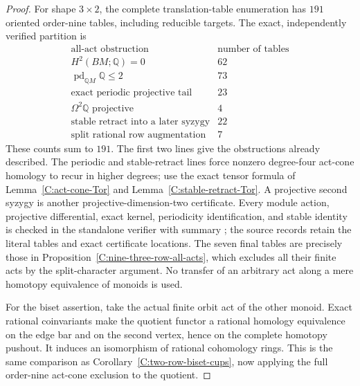\begin{proof}
For shape $3\times2$, the complete translation-table enumeration
has $191$ oriented order-nine tables, including reducible targets.
The exact, independently verified partition is
\[
\begin{array}{l|r}
 \text{all-act obstruction}&\text{number of tables}\\\hline
 H^2(BM;\mathbb Q)=0&62\\
 \operatorname{pd}_{\mathbb QM}\mathbb Q\leq2&73\\
 \text{exact periodic projective tail}&23\\
 \Omega^2\mathbb Q\text{ projective}&4\\
 \text{stable retract into a later syzygy}&22\\
 \text{split rational row augmentation}&7
\end{array}
\]
These counts sum to $191$.  The first two lines give the obstructions
already described.  The periodic and stable-retract lines force
nonzero degree-four act-cone homology to recur in higher degrees;
use the exact tensor formula of Lemma~\ref{C:act-cone-Tor} and
Lemma~\ref{C:stable-retract-Tor}.  A projective second syzygy is
another projective-dimension-two certificate.  Every module action,
projective differential, exact kernel, periodicity identification,
and stable identity is checked in the standalone verifier with
summary ; the
source records retain the literal tables and exact certificate
locations.  The seven final tables are precisely those in
Proposition~\ref{C:nine-three-row-all-acts}, which excludes all their
finite acts by the split-character argument.  No transfer of an
arbitrary act along a mere homotopy equivalence of monoids is used.

For the biset assertion, take the actual finite orbit act of the
other monoid.  Exact rational coinvariants make the quotient functor
a rational homology equivalence on the edge bar and on the second
vertex, hence on the complete homotopy pushout.  It induces an
isomorphism of rational cohomology rings.  This is the same
comparison as Corollary~\ref{C:two-row-biset-cups}, now applying
the full order-nine act-cone exclusion to the quotient.
\end{proof}

